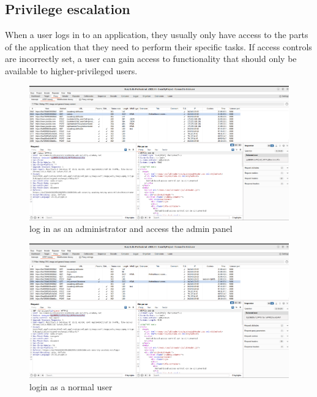 \documentclass[
	a4paper, %
	12pt, %
]{CSSullivanBusinessReport}
\begin{document}
\subsection*{Privilege escalation}
\begin{fullwidth}
    
When a user logs in to an application, they usually only have access to the parts of the application that they need to perform their specific tasks. If access controls are incorrectly set, a user can gain access to functionality that should only be available to higher-privileged users.


\begin{figure}[H]
    \centering
    \includegraphics[width=1\textwidth]{Images/anikaScreensots/prev1.png}
    \caption{log in as an administrator and access the admin panel}
    \label{fig:enter-label}
\end{figure}


\begin{figure}[H]
    \centering
    \includegraphics[width=1\textwidth]{Images/anikaScreensots/prev2.png}
    
    \caption{login as a normal user}
    \label{fig:enter-label}
\end{figure}


\end{fullwidth}
\end{document}

